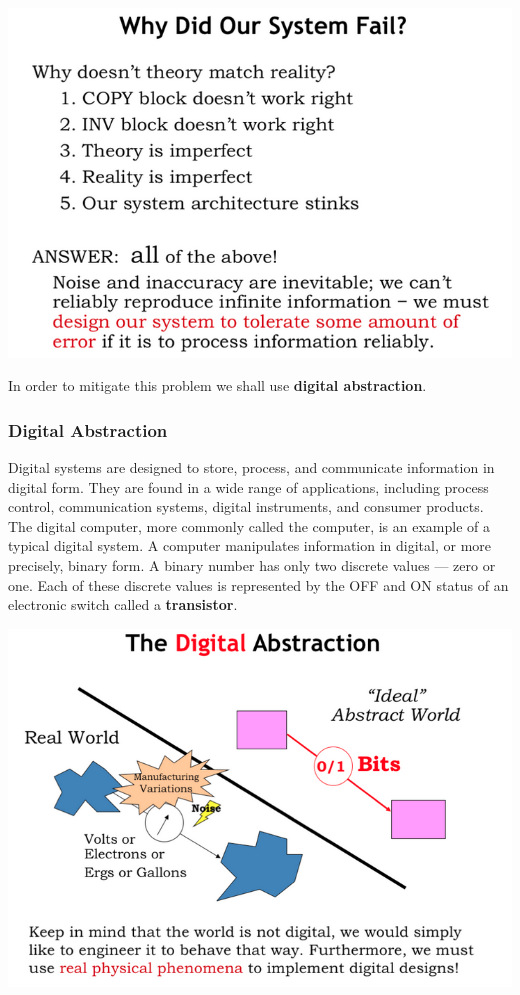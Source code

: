 \documentclass[a4paper,twoside]{article}
\numberwithin{equation}{section}
\begin{document}
\begin{center}
    \includegraphics[scale=0.4]{assets/why_fail.png}
\end{center}
In order to mitigate this problem we shall use \textbf{digital abstraction}.

\subsubsection{Digital Abstraction}
Digital systems are designed to store, process, and communicate information in digital form.
They are found in a wide range of applications, including process control, communication systems,
digital instruments, and consumer products. The digital computer, more commonly called the computer,
is an example of a typical digital system. A computer manipulates information in digital, or more precisely,
binary form. A binary number has only two discrete values — zero or one. Each of these discrete
values is represented by the OFF and ON status of an electronic switch called a \textbf{transistor}.
\begin{center}
    \includegraphics[scale=0.4]{assets/digital_abs.png}
\end{center}
\end{document}
